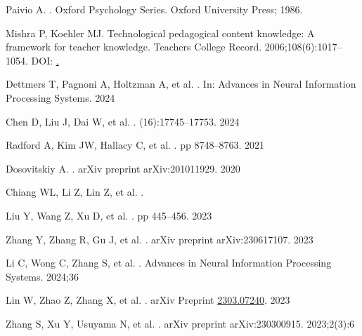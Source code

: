 \documentclass[10pt,letterpaper]{article}
\begin{document}
\begin{thebibliography}{10}
Paivio A.
.
\newblock Oxford Psychology Series. Oxford University Press; 1986.

Mishra P, Koehler MJ.
\newblock Technological pedagogical content knowledge: A framework for teacher knowledge.
\newblock Teachers College Record. 2006;108(6):1017--1054.
\newblock DOI: \href{https://doi.org/10.1111/j.1467-9620.2006.00684.x}.

Dettmers T, Pagnoni A, Holtzman A, et al.
.
\newblock In: Advances in Neural Information Processing Systems. 2024

Chen D, Liu J, Dai W, et al.
.
(16):17745--17753. 2024

Radford A, Kim JW, Hallacy C, et al.
.
\newblock pp 8748--8763. 2021

Dosovitskiy A.
.
\newblock arXiv preprint arXiv:201011929. 2020

Chiang WL, Li Z, Lin Z, et al.
.

Liu Y, Wang Z, Xu D, et al.
.
\newblock pp 445--456. 2023

Zhang Y, Zhang R, Gu J, et al.
.
\newblock arXiv preprint arXiv:230617107. 2023

Li C, Wong C, Zhang S, et al.
.
\newblock Advances in Neural Information Processing Systems. 2024;36

Lin W, Zhao Z, Zhang X, et al.
.
\newblock arXiv Preprint {\href{https://arxiv.org/abs/2303.07240}{{2303.07240}}}. 2023

Zhang S, Xu Y, Usuyama N, et al.
.
\newblock arXiv preprint arXiv:230300915. 2023;2(3):6


\end{thebibliography}
\end{document}

